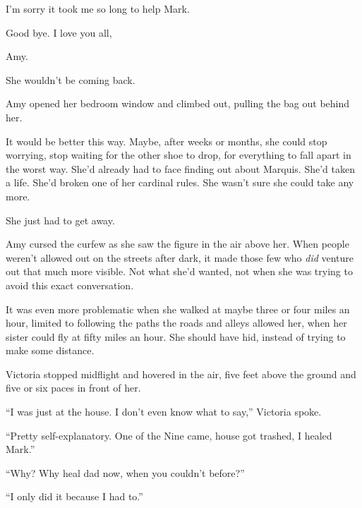 I'm sorry it took me so long to help Mark.



Good bye.  I love you all,



Amy.



She wouldn't be coming back.



Amy opened her bedroom window and climbed out, pulling the bag out behind her.



It would be better this way.  Maybe, after weeks or months, she could stop worrying, stop waiting for the other shoe to drop, for everything to fall apart in the worst way.  She'd already had to face finding out about Marquis.  She'd taken a life.  She'd broken one of her cardinal rules.  She wasn't sure she could take any more.



She just had to get away.



\sectionbreak



Amy cursed the curfew as she saw the figure in the air above her.  When people weren't allowed out on the streets after dark, it made those few who \emph{did} venture out that much more visible.  Not what she'd wanted, not when she was trying to avoid this exact conversation.



It was even more problematic when she walked at maybe three or four miles an hour, limited to following the paths the roads and alleys allowed her, when her sister could fly at fifty miles an hour.  She should have hid, instead of trying to make some distance.



Victoria stopped midflight and hovered in the air, five feet above the ground and five or six paces in front of her.



``I was just at the house.  I don't even know what to say,'' Victoria spoke.



``Pretty self-explanatory.  One of the Nine came, house got trashed, I healed Mark.''



``Why?  Why heal dad now, when you couldn't before?''



``I only did it because I had to.''



